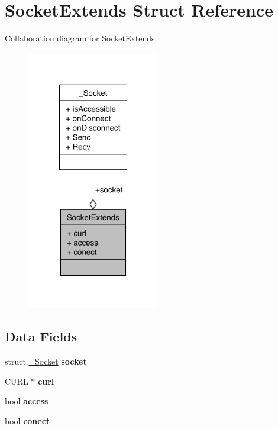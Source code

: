 \hypertarget{structSocketExtends}{\section{Socket\-Extends Struct Reference}
\label{structSocketExtends}
}


Collaboration diagram for Socket\-Extends\-:\nopagebreak
\begin{figure}[H]
\begin{center}
\leavevmode
\includegraphics[width=164pt]{d3/db5/structSocketExtends__coll__graph}
\end{center}
\end{figure}
\subsection*{Data Fields}
\begin{DoxyCompactItemize}
\item 
\hypertarget{structSocketExtends_a6d8ff51667f3038e4e0974b8dfcb8b59}{struct \hyperlink{struct__Socket}{\-\_\-\-Socket} {\bfseries socket}}\label{structSocketExtends_a6d8ff51667f3038e4e0974b8dfcb8b59}

\item 
\hypertarget{structSocketExtends_a6a59594ba3469ec6a1d56f6631e275e0}{C\-U\-R\-L $\ast$ {\bfseries curl}}\label{structSocketExtends_a6a59594ba3469ec6a1d56f6631e275e0}

\item 
\hypertarget{structSocketExtends_ab4e2372937bb1eec89f2a954a4db6604}{bool {\bfseries access}}\label{structSocketExtends_ab4e2372937bb1eec89f2a954a4db6604}

\item 
\hypertarget{structSocketExtends_a506634736b4585cbeac7cbdefec1e540}{bool {\bfseries conect}}\label{structSocketExtends_a506634736b4585cbeac7cbdefec1e540}

\end{DoxyCompactItemize}


